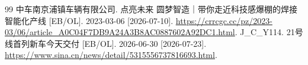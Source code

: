 
\begin{flushleft}
  \begin{small}
    \begin{thebibliography}{99}
      \setlength{\itemsep}{0pt}
      \setlength{\parsep}{0pt}
       中车南京浦镇车辆有限公司. 点亮未来 圆梦智造｜带你走近科技感爆棚的焊接智能化产线 [EB/OL]. 2023-03-06 [2026-07-10].
      \href{https://crrcgc.cc/pz/2023-03/06/article\_A0C04F7DB9A24A3B8AC0887602A92DC1.html}{\color{blue} https://crrcgc.cc/pz/2023-03/06/article\_A0C04F7DB9A24A3B8AC0887602A92DC1.html}.
       J\_C\_Y114. 21号线首列新车今天交付 [EB/OL]. 2026-06-30 [2026-07-23].
      \href{https://www.sina.cn/news/detail/5315556737816693.html}{\color{blue} https://www.sina.cn/news/detail/5315556737816693.html}.
    \end{thebibliography}
  \end{small}
\end{flushleft}
